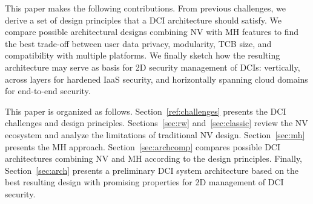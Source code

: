 \documentclass{sig-alternate}
\begin{document}
This paper makes the following contributions. From previous challenges, we derive a set of design principles that a DCI architecture should satisfy. We compare possible architectural designs combining NV with MH features to find the best trade-off between user data privacy, modularity, TCB size, and compatibility with multiple platforms. We finally sketch how the resulting architecture may serve as basis for 2D security management of DCIs: vertically, across layers for hardened IaaS security, and horizontally spanning cloud domains for end-to-end security.

This paper is organized as follows. Section~\ref{ref:challenges} presents the DCI challenges and design principles. Sections~\ref{sec:rw} and~\ref{sec:classic} review the NV ecosystem and analyze the limitations of traditional NV design. Section~\ref{sec:mh} presents the MH approach. Section~\ref{sec:archcomp} compares possible DCI architectures combining NV and MH according to the design principles.
Finally, Section~\ref{sec:arch} presents a preliminary DCI system architecture based on the best resulting design with promising properties for 2D management of DCI security.
\end{document}
